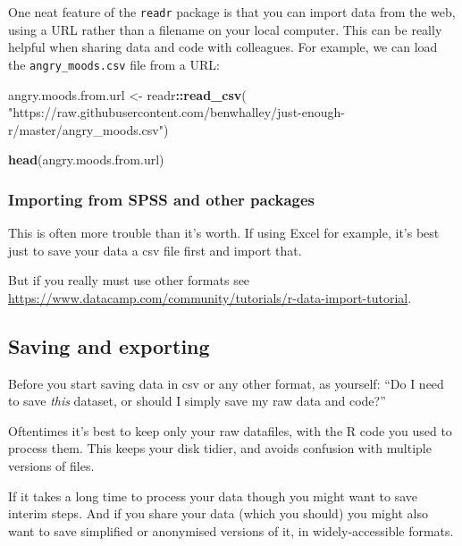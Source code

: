 \documentclass[]{article}
\newenvironment{Shaded}{\begin{snugshade}}{\end{snugshade}}
\newcommand{\KeywordTok}[1]{\textcolor[rgb]{0.13,0.29,0.53}{\textbf{#1}}}
\newcommand{\StringTok}[1]{\textcolor[rgb]{0.31,0.60,0.02}{#1}}
\newcommand{\OperatorTok}[1]{\textcolor[rgb]{0.81,0.36,0.00}{\textbf{#1}}}
\newcommand{\NormalTok}[1]{#1}
\theoremstyle{definition}
\theoremstyle{definition}
\theoremstyle{definition}
\theoremstyle{remark}
\begin{document}
One neat feature of the \texttt{readr} package is that you can import
data from the web, using a URL rather than a filename on your local
computer. This can be really helpful when sharing data and code with
colleagues. For example, we can load the \texttt{angry\_moods.csv} file
from a URL:

\begin{Shaded}
\begin{Highlighting}[]
\NormalTok{angry.moods.from.url <-}\StringTok{ }\NormalTok{readr}\OperatorTok{::}\KeywordTok{read_csv}\NormalTok{(}
  \StringTok{"https://raw.githubusercontent.com/benwhalley/just-enough-r/master/angry_moods.csv"}\NormalTok{)}

\KeywordTok{head}\NormalTok{(angry.moods.from.url)}
\end{Highlighting}
\end{Shaded}

\subsubsection*{Importing from SPSS and other
packages}\label{importing-proprietary-formats}

This is often more trouble than it's worth. If using Excel for example,
it's best just to save your data a csv file first and import that.

But if you really must use other formats see
\url{https://www.datacamp.com/community/tutorials/r-data-import-tutorial}.

\subsection*{Saving and exporting}\label{saving-and-exporting}

Before you start saving data in csv or any other format, as yourself:
``Do I need to save \emph{this} dataset, or should I simply save my raw
data and code?''

Oftentimes it's best to keep only your raw datafiles, with the R code
you used to process them. This keeps your disk tidier, and avoids
confusion with multiple versions of files.

If it takes a long time to process your data though you might want to
save interim steps. And if you share your data (which you should) you
might also want to save simplified or anonymised versions of it, in
widely-accessible formats.
\end{document}
